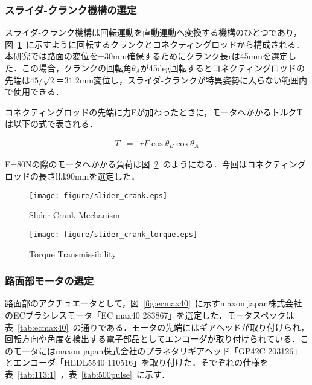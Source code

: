 \documentclass[a4paper,12pt]{article_vdlab_sotsuron}
\begin{document}
\subsubsection{スライダ-クランク機構の選定}
スライダ-クランク機構は回転運動を直動運動へ変換する機構のひとつであり，図~\ref{fig:slider_crank}~に示すように回転するクランクとコネクティングロッドから構成される．本研究では路面の変位を±30mm確保するためにクランク長rは45mmを選定した．この場合，クランクの回転角$θ_A$が45deg回転するとコネクティングロッドの先端は$45/\sqrt{2}＝31.2$mm変位し，スライダ-クランクが特異姿勢に入らない範囲内で使用できる．\par
コネクティングロッドの先端に力Fが加わったときに，モータへかかるトルクTは以下の式で表される．

\begin{eqnarray}
 \label{eq:slider_crank} T &=& rF\cos\theta_B\cos\theta_A 
\end{eqnarray}

F=80Nの際のモータへかかる負荷は図~\ref{fig:slider_crank_torque}~のようになる．今回はコネクティングロッドの長さlは90mmを選定した．

\vspace*{10mm}
\begin{figure}[htp]
  \begin{center}
    \texttt{[image: figure/slider\_crank.eps]}
    \vspace*{3mm}
    \caption{Slider Crank Mechanism}
    \label{fig:slider_crank}
  \end{center}
\end{figure}

\vspace*{10mm}
\begin{figure}[htp]
  \hspace*{50mm}
    \texttt{[image: figure/slider\_crank\_torque.eps]}
    \vspace*{3mm}
    \caption{Torque Transmissibility}
    \label{fig:slider_crank_torque}
\end{figure}

\newpage
\subsubsection{路面部モータの選定}
路面部のアクチュエータとして，図~\ref{fig:ecmax40}~に示すmaxon japan株式会社のECブラシレスモータ「EC max40 283867」を選定した．モータスペックは表~\ref{tab:ecmax40}~の通りである．モータの先端にはギアヘッドが取り付けられ，回転方向や角度を検出する電子部品としてエンコーダが取り付けられている．このモータにはmaxon japan株式会社のプラネタリギアヘッド「GP42C 203126」とエンコーダ「HEDL5540 110516」を取り付けた．そでぞれの仕様を表~\ref{tab:113:1}~，表~\ref{tab:500pulse}~に示す．
\end{document}
